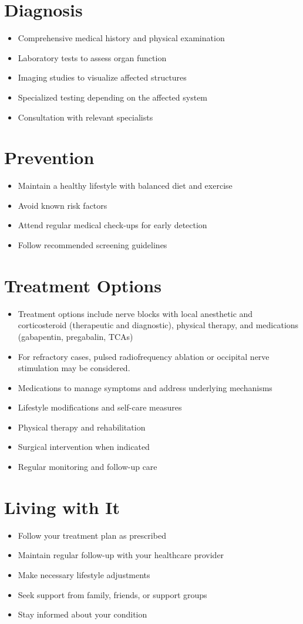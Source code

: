 \section{Diagnosis}
\begin{itemize}[noitemsep]
  \item Comprehensive medical history and physical examination
  \item Laboratory tests to assess organ function
  \item Imaging studies to visualize affected structures
  \item Specialized testing depending on the affected system
  \item Consultation with relevant specialists
\end{itemize}
\section{Prevention}
\begin{itemize}[noitemsep]
  \item Maintain a healthy lifestyle with balanced diet and exercise
  \item Avoid known risk factors
  \item Attend regular medical check-ups for early detection
  \item Follow recommended screening guidelines
\end{itemize}
\section{Treatment Options}
\begin{itemize}[noitemsep]
  \item Treatment options include nerve blocks with local anesthetic and corticosteroid (therapeutic and diagnostic), physical therapy, and medications (gabapentin, pregabalin, TCAs)
  \item For refractory cases, pulsed radiofrequency ablation or occipital nerve stimulation may be considered.
  \item Medications to manage symptoms and address underlying mechanisms
  \item Lifestyle modifications and self-care measures
  \item Physical therapy and rehabilitation
  \item Surgical intervention when indicated
  \item Regular monitoring and follow-up care
\end{itemize}
\section{Living with It}
\begin{itemize}[noitemsep]
  \item Follow your treatment plan as prescribed
  \item Maintain regular follow-up with your healthcare provider
  \item Make necessary lifestyle adjustments
  \item Seek support from family, friends, or support groups
  \item Stay informed about your condition
\end{itemize}
